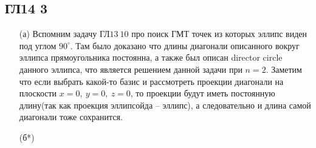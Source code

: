 \subsection*{ГЛ14 3}
\begin{enumerate}
	\item[(а)] 
	Вспомним задачу ГЛ$13\ 10$ про поиск ГМТ точек из которых эллипс виден под углом $90^{\circ}$. Там было доказано что длины диагонали описанного вокруг эллипса прямоугольника постоянна, а также был описан director circle данного эллипса, что является решением данной задачи при $n = 2$. Заметим что если выбрать какой-то базис и рассмотреть проекции диагонали на плоскости $x = 0,\ y = 0,\ z = 0$, то проекции будут иметь постоянную длину(так как проекция эллипсойда -- эллипс), а следовательно и длина самой диагонали тоже сохранится.
	\item[(б*)] 
\end{enumerate}
		